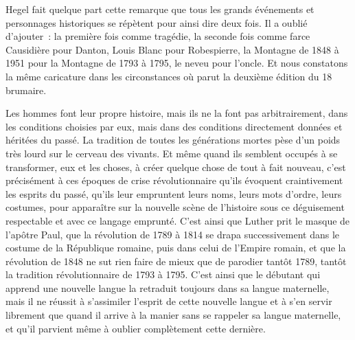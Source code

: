 \documentclass[french,twoside]{book} %
\newcommand\chaptercont{} %
\begin{document}
\chaptercont
\noindent Hegel fait quelque part cette remarque que tous les grands événements et personnages historiques se répètent pour ainsi dire deux fois. Il a oublié d’ajouter : la première fois comme tragédie, la seconde fois comme farce Causidière pour Danton, Louis Blanc pour Robespierre, la Montagne de 1848 à 1951 pour la Montagne de 1793 à 1795, le neveu pour l’oncle. Et nous constatons la même caricature dans les circonstances où parut la deuxième édition du 18 brumaire.\par
Les hommes font leur propre histoire, mais ils ne la font pas arbitrairement, dans les conditions choisies par eux, mais dans des conditions directement données et héritées du passé. La tradition de toutes les générations mortes pèse d’un poids très lourd sur le cerveau des vivants. Et même quand ils semblent occupés à se transformer, eux et les choses, à créer quelque chose de tout à fait nouveau, c’est précisément à ces époques de crise révolutionnaire qu’ils évoquent craintivement les esprits du passé, qu’ils leur empruntent leurs noms, leurs mots d’ordre, leurs costumes, pour apparaître sur la nouvelle scène de l’histoire sous ce déguisement respectable et avec ce langage emprunté. C’est ainsi que Luther prit le masque de l’apôtre Paul, que la révolution de 1789 à 1814 se drapa successivement dans le costume de la République romaine, puis dans celui de l’Empire romain, et que la révolution de 1848 ne sut rien faire de mieux que de parodier tantôt 1789, tantôt la tradition révolutionnaire de 1793 à 1795. C’est ainsi que le débutant qui apprend une nouvelle langue la retraduit toujours dans sa langue maternelle, mais il ne réussit à s’assimiler l’esprit de cette nouvelle langue et à s’en servir librement que quand il arrive à la manier sans se rappeler sa langue maternelle, et qu’il parvient même à oublier complètement cette dernière.\par
\end{document}
